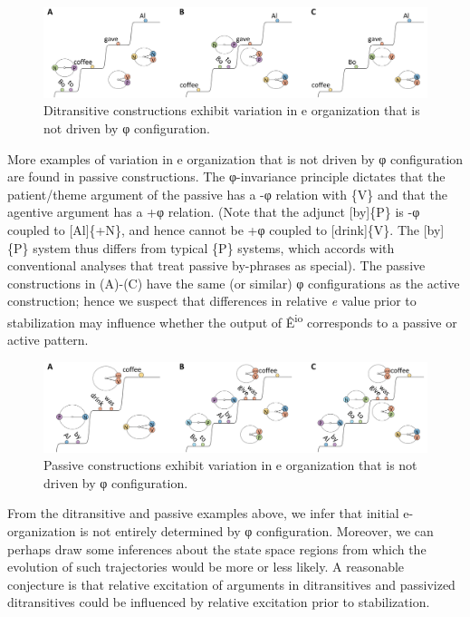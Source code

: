   
\begin{figure}
\includegraphics[width=\textwidth]{figures/Tilsen-img80.png}
\caption{Ditransitive constructions exhibit variation in e organization that is not driven by φ configuration.}
\label{fig:4:30}
\end{figure}
 

  More examples of variation in e organization that is not driven by φ configuration are found in passive constructions. The φ-invariance principle dictates that the patient/theme argument of the passive has a -φ relation with \{V\} and that the agentive argument has a +φ relation. (Note that the adjunct [by]\{P\} is -φ coupled to [Al]\{+N\}, and hence cannot be +φ coupled to [drink]\{V\}. The [by]\{P\} system thus differs from typical \{P\} systems, which accords with conventional analyses that treat passive by-phrases as special). The passive constructions in (A)-(C) have the same (or similar) φ configurations as the active construction; hence we suspect that differences in relative \textit{e} value prior to stabilization may influence whether the output of Ê\textsuperscript{io} corresponds to a passive or active pattern.

  
\begin{figure}
\includegraphics[width=\textwidth]{figures/Tilsen-img81.png}
\caption{Passive constructions exhibit variation in e organization that is not driven by φ configuration.}
\label{fig:4:31}
\end{figure}
 

  From the ditransitive and passive examples above, we infer that initial e-organization is not entirely determined by φ configuration. Moreover, we can perhaps draw some inferences about the state space regions from which the evolution of such trajectories would be more or less likely. A reasonable conjecture is that relative excitation of arguments in ditransitives and passivized ditransitives could be influenced by relative excitation prior to stabilization.

